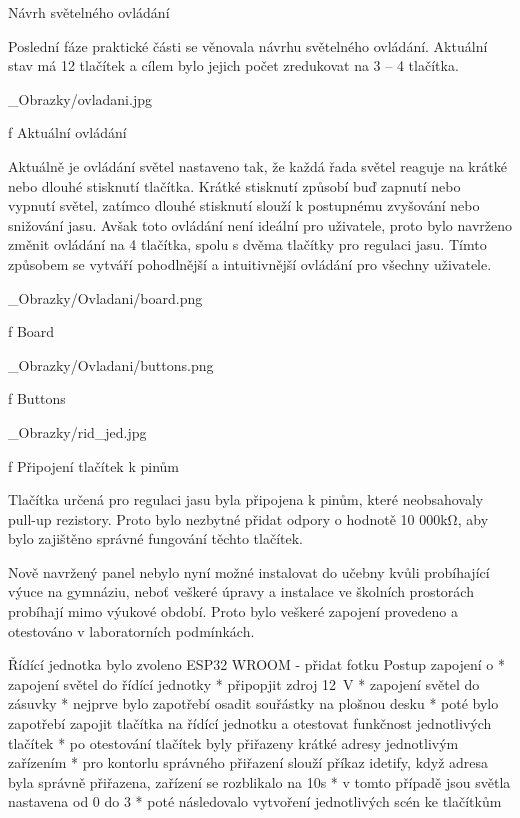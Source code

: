 \chap Návrh světelného ovládání


Poslední fáze praktické části se věnovala návrhu světelného ovládání. Aktuální stav má 12 tlačítek a
cílem bylo jejich počet zredukovat na 3 -- 4 tlačítka.

\medskip {}
\picw=10cm _Obrazky/ovladani.jpg
\caption/f Aktuální ovládání
\medskip


Aktuálně je ovládání světel nastaveno tak, že každá řada světel reaguje na krátké nebo dlouhé stisknutí tlačítka.
Krátké stisknutí způsobí buď zapnutí nebo vypnutí světel, zatímco dlouhé stisknutí slouží k postupnému zvyšování nebo snižování jasu.
Avšak toto ovládání není ideální pro uživatele, proto bylo navrženo změnit ovládání na 4 tlačítka, spolu s dvěma tlačítky pro regulaci jasu.
Tímto způsobem se vytváří pohodlnější a intuitivnější ovládání pro všechny uživatele.

\medskip {}
\picw=10cm _Obrazky/Ovladani/board.png
\caption/f Board
\medskip

\medskip {}
\picw=10cm _Obrazky/Ovladani/buttons.png
\caption/f Buttons
\medskip

\medskip {}
\picw=10cm _Obrazky/rid_jed.jpg
\caption/f Připojení tlačítek k pinům
\medskip


Tlačítka určená pro regulaci jasu byla připojena k pinům, které neobsahovaly pull-up rezistory.
Proto bylo nezbytné přidat odpory o hodnotě 10 000kΩ, aby bylo zajištěno správné fungování těchto tlačítek.

Nově navržený panel nebylo nyní možné instalovat do učebny kvůli probíhající výuce na gymnáziu, neboť veškeré úpravy
a instalace ve školních prostorách probíhají mimo výukové období. Proto bylo veškeré zapojení provedeno a otestováno v laboratorních podmínkách.

\medskip
\noindent
Řídící jednotka bylo zvoleno ESP32 WROOM - přidat fotku
\noindent
{\sbf Postup zapojení}
\begitems \style o
* zapojení světel do řídící jednotky
* připopjit zdroj 12~V
* zapojení světel do zásuvky
* nejprve bylo zapotřebí osadit souřástky na plošnou desku
* poté bylo zapotřebí zapojit tlačítka na řídící jednotku a otestovat funkčnost jednotlivých tlačítek
* po otestování tlačítek byly přiřazeny krátké adresy jednotlivým zařízením
* pro kontorlu správného přiřazení slouží příkaz idetify, když adresa byla správně přiřazena, zařízení se rozblikalo na 10s
* v tomto případě jsou světla nastavena od 0 do 3
* poté následovalo vytvoření jednotlivých scén ke tlačítkům
\enditems

